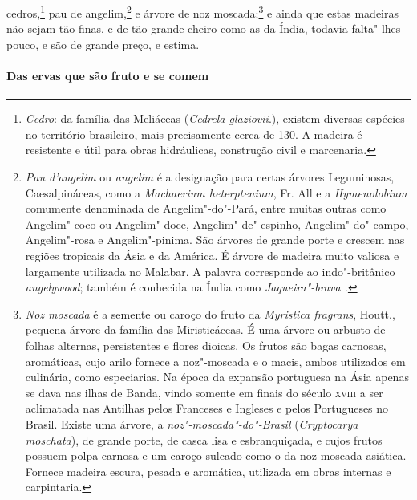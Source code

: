 cedros,\footnote{ \textit{Cedro}: da família das Meliáceas 
(\textit{Cedrela glaziovii}.), existem diversas espécies no território
brasileiro, mais precisamente cerca de 130. A madeira é resistente e
útil para obras hidráulicas, construção civil e marcenaria.} pau de
angelim,\footnote{ \textit{Pau d'angelim} ou \textit{angelim} é a
designação para certas árvores Leguminosas, Caesalpináceas, como a 
\textit{Machaerium heterptenium}, Fr. All e a \textit{Hymenolobium} 
comumente denominada de Angelim"-do"-Pará, entre muitas outras como
Angelim"-coco ou Angelim"-doce, Angelim"-de"-espinho, Angelim"-do"-campo,
Angelim"-rosa e Angelim"-pinima. São árvores de grande porte e crescem
nas regiões tropicais da Ásia e da América. É árvore de madeira muito
valiosa e largamente utilizada no Malabar. A palavra corresponde ao
indo"-britânico \textit{angelywood}; também é conhecida na Índia como
\textit{Jaqueira"-brava .} } e árvore de noz moscada;\footnote{ \textit{Noz moscada} 
é a semente ou caroço do fruto da \textit{Myristica fragrans}, Houtt., pequena árvore da família das
Miristicáceas. É uma árvore ou arbusto de folhas alternas, persistentes
e flores dioicas. Os frutos são bagas carnosas, aromáticas, cujo arilo
fornece a noz"-moscada e o macis, ambos utilizados em culinária, como
especiarias. Na época da expansão portuguesa na Ásia apenas se dava nas
ilhas de Banda, vindo somente em finais do século \textsc{xviii} a ser
aclimatada nas Antilhas pelos Franceses e Ingleses e pelos Portugueses
no Brasil. Existe uma árvore, a \textit{noz"-moscada"-do"-Brasil} (\textit{Cryptocarya moschata}), 
de grande porte, de casca lisa e esbranquiçada,
e cujos frutos possuem polpa carnosa e um caroço sulcado como o da noz
moscada asiática. Fornece madeira escura, pesada e aromática, utilizada
em obras internas e carpintaria.} e ainda que estas madeiras não sejam
tão finas, e de tão grande cheiro como as da Índia, todavia falta"-lhes
pouco, e são de grande preço, e estima.

\paragraph{Das ervas que são fruto e se comem}

